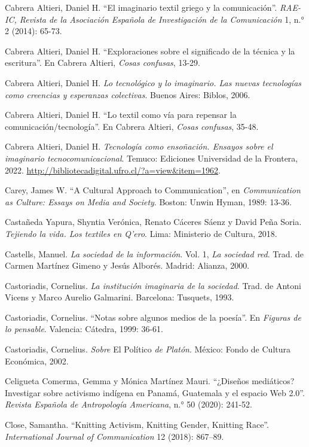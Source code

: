 \documentclass{tufte-handout}
\begin{document}
\begin{hangparas}{.25in}{1}
Cabrera Altieri, Daniel H. ``El imaginario textil griego y la
comunicación''. \emph{RAE-IC, Revista de la Asociación Española de
Investigación de la Comunicación} 1, n.° 2 (2014): 65-73.

Cabrera Altieri, Daniel H. ``Exploraciones sobre el significado de la
técnica y la escritura''. En Cabrera Altieri, \emph{Cosas confusas},
13-29.

Cabrera Altieri, Daniel H. \emph{Lo tecnológico y lo imaginario. Las
nuevas tecnologías como creencias y esperanzas colectivas}. Buenos
Aires: Biblos, 2006.

Cabrera Altieri, Daniel H. ``Lo textil como vía para repensar la
comunicación/tecnología''. En Cabrera Altieri, \emph{Cosas confusas},
35-48.

Cabrera Altieri, Daniel H. \emph{Tecnología como ensoñación. Ensayos
sobre el imaginario tecnocomunicacional}. Temuco: Ediciones Universidad
de la Frontera, 2022.
\url{http://bibliotecadigital.ufro.cl/?a=view\&item=1962}.

Carey, James W. ``A Cultural Approach to Communication'', en
\emph{Communication as Culture: Essays on Media and Society}. Boston:
Unwin Hyman, 1989: 13-36.

Castañeda Yapura, Shyntia Verónica, Renato Cáceres Sáenz y David Peña
Soria. \emph{Tejiendo la vida. Los textiles en Q'ero}. Lima: Ministerio
de Cultura, 2018.

Castells, Manuel. \emph{La sociedad de la información}. Vol. 1, \emph{La
sociedad red}. Trad. de Carmen Martínez Gimeno y Jesús Alborés. Madrid:
Alianza, 2000.

Castoriadis, Cornelius. \emph{La institución imaginaria de la sociedad}.
Trad. de Antoni Vicens y Marco Aurelio Galmarini. Barcelona: Tusquets,
1993.

Castoriadis, Cornelius. ``Notas sobre algunos medios de la poesía''. En
\emph{Figuras de lo pensable}. Valencia: Cátedra, 1999: 36-61.

Castoriadis, Cornelius. \emph{Sobre} El Político \emph{de Platón}.
México: Fondo de Cultura Económica, 2002.

Celigueta Comerma, Gemma y Mónica Martínez Mauri. ``¿Diseños mediáticos?
Investigar sobre activismo indígena en Panamá, Guatemala y el espacio
Web 2.0''. \emph{Revista Española de Antropología Americana}, n.° 50
(2020): 241-52.

Close, Samantha. ``Knitting Activism, Knitting Gender, Knitting Race''.
\emph{International Journal of Communication} 12 (2018): 867--89.


\end{hangparas}
\end{document}
